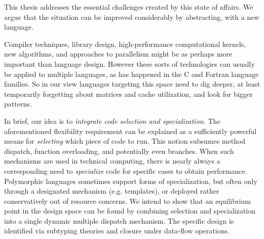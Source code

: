 


This thesis addresses the essential challenges created by
this state of affairs.
We argue that the situation   
can be improved considerably by
abstracting, with a new language.

 Compiler 
techniques, library design, high-performance
computational kernels, new algorithms, and approaches to parallelism might
be as perhaps more important than language design.
However these sorts of technologies can usually be applied to multiple
languages, as has happened in the C and Fortran language families.
So in our view languages targeting this space need to dig deeper,
at least temporarily forgetting about matrices and cache utilization,
and look for bigger patterns.

In brief, our idea is to \emph{integrate code selection and specialization}.
The aforementioned flexibility requirement can be explained as
a sufficiently powerful means for \emph{selecting} which piece of code
to run. This notion subsumes method dispatch, function overloading,
and potentially even branches. When such mechanisms are used in
technical computing, there is nearly always a corresponding need to
\emph{specialize} code for specific cases to obtain performance.
Polymorphic languages sometimes support forms of specialization,
but often only through a designated mechanism (e.g. templates), or
deployed rather conservatively out of resource concerns.
We intend to show that an equilibrium point in the design
space can be found by combining selection and specialization
into a single dynamic multiple dispatch mechanism.
The specific design is identified via
subtyping theories and closure under data-flow operations.

